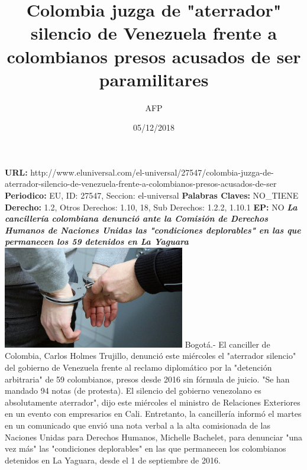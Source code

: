\documentclass{article}%
\title{\textbf{Colombia juzga de "aterrador" silencio de Venezuela frente a colombianos presos acusados de ser paramilitares}}%
\author{AFP}%
\date{05/12/2018}%
\begin{document}
%
\normalsize%
\maketitle%
\textbf{URL: }%
http://www.eluniversal.com/el{-}universal/27547/colombia{-}juzga{-}de{-}aterrador{-}silencio{-}de{-}venezuela{-}frente{-}a{-}colombianos{-}presos{-}acusados{-}de{-}ser\newline%
%
\textbf{Periodico: }%
EU, %
ID: %
27547, %
Seccion: %
el{-}universal\newline%
%
\textbf{Palabras Claves: }%
NO\_TIENE\newline%
%
\textbf{Derecho: }%
1.2, %
Otros Derechos: %
1.10, 18, %
Sub Derechos: %
1.2.2, 1.10.1\newline%
%
\textbf{EP: }%
NO\newline%
\newline%
%
\textbf{\textit{La cancillería colombiana denunció ante la Comisión de Derechos Humanos de Naciones Unidas las "condiciones deplorables" en las que permanecen los 59 detenidos en La Yaguara}}%
\newline%
\newline%
%
\includegraphics[width=300px]{223.jpg}%
\newline%
%
Bogotá.{-} El canciller de Colombia, Carlos Holmes Trujillo, denunció este miércoles el "aterrador silencio" del gobierno de Venezuela frente al reclamo diplomático por la "detención arbitraria" de 59 colombianos, presos desde 2016 sin fórmula de juicio.%
\newline%
%
"Se han mandado 94 notas (de protesta). El silencio del gobierno venezolano es absolutamente aterrador", dijo este miércoles el ministro de Relaciones Exteriores en un evento con empresarios en Cali.%
\newline%
%
Entretanto, la cancillería informó el martes en un comunicado que envió una nota verbal a la alta comisionada de las Naciones Unidas para Derechos Humanos, Michelle Bachelet, para denunciar "una vez más" las "condiciones deplorables" en las que permanecen los colombianos detenidos en La Yaguara, desde el 1 de septiembre de 2016.%
\end{document}
